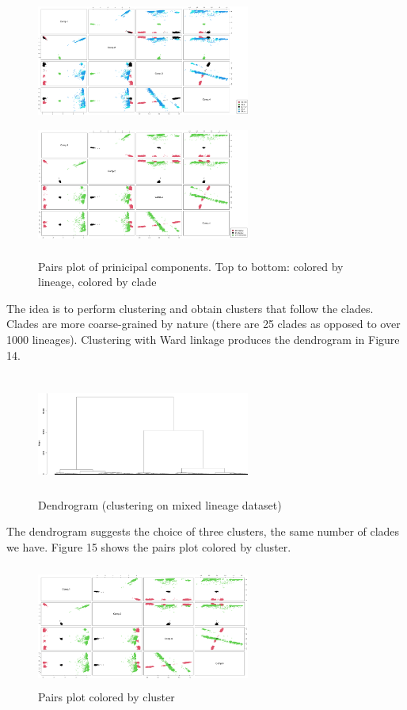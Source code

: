 \documentclass[twoside,twocolumn]{article}
\begin{document}
	\begin{figure}[h]
		\caption{Pairs plot of prinicipal components. Top to bottom: colored by lineage, colored by clade}
		\label{pairsx}
		\centering
		\includegraphics[width=70mm, height=40mm]{pairsx.png}
		\includegraphics[width=70mm, height=40mm]{pairsx2.png}
	\end{figure}
	The idea is to perform clustering and obtain clusters that follow the clades. Clades are more coarse-grained by nature (there are 25 clades as opposed to over 1000 lineages). Clustering with Ward linkage produces the dendrogram in Figure 14.
	\begin{figure}[h]
		\caption{Dendrogram (clustering on mixed lineage dataset)}
		\label{ward2}
		\centering
		\includegraphics[width=70mm, height=40mm]{ward.png}
	\end{figure}
	The dendrogram suggests the choice of three clusters, the same number of clades we have. Figure 15 shows the pairs plot colored by cluster.
	\begin{figure}[h]
		\caption{Pairs plot colored by cluster}
		\label{pairs3}
		\centering
		\includegraphics[width=70mm, height=40mm]{pairs3.png}
	\end{figure}
\end{document}
